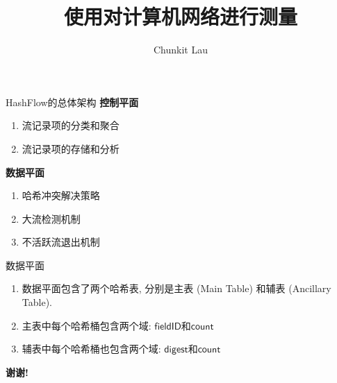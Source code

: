 \documentclass{beamer}
\title{使用{\system}对计算机网络进行测量}
\author{Chunkit Lau}
\institute{北京邮电大学}
\date{} %
\newcommand{\system}{HashFlow}
\newcommand{\field}{\mathsf}
\begin{document}
{ 
\frame{\titlepage}}



\begin{frame}{{\system}的总体架构}
\textbf{控制平面}
\begin{enumerate}
\item 流记录项的分类和聚合
\item 流记录项的存储和分析
\end{enumerate}
\textbf{数据平面}
\begin{enumerate}
\item 哈希冲突解决策略
\item 大流检测机制
\item 不活跃流退出机制
\end{enumerate}
\end{frame}

\begin{frame}{数据平面}
\begin{enumerate}
\item 数据平面包含了两个哈希表, 分别是主表 (Main Table) 和辅表 (Ancillary Table).
\item 主表中每个哈希桶包含两个域: $\field{fieldID}$和$\field{count}$
\item 辅表中每个哈希桶也包含两个域: $\field{digest}$和$\field{count}$
\end{enumerate}
\begin{figure}
	\centering
\end{figure}

\end{frame}

  
\begin{frame}{}
\begin{center}
    \textbf{谢谢!}
\end{center}
\end{frame}
\end{document}
